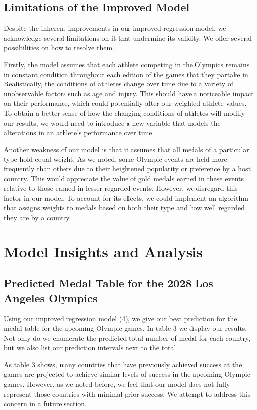 \documentclass{mcmthesis}
\begin{document}
\subsection{Limitations of the Improved Model}
Despite the inherent improvements in our improved regression model, we acknowledge several limitations on it that undermine its validity. We offer several possibilities on how to resolve them. \par 
Firstly, the model assumes that each athlete competing in the Olympics remains in constant condition throughout each edition of the games that they partake in. Realistically, the conditions of athletes change over time due to a variety of unobservable factors such as age and injury. This should have a noticeable impact on their performance, which could potentially alter our weighted athlete values. To obtain a better sense of how the changing conditions of athletes will modify our results, we would need to introduce a new variable that models the alterations in an athlete's performance over time. \par
Another weakness of our model is that it assumes that all medals of a particular type hold equal weight. As we noted, some Olympic events are held more frequently than others due to their heightened popularity or preference by a host country. This would appreciate the value of gold medals earned in these events relative to those earned in lesser-regarded events. However, we disregard this factor in our model. To account for its effects, we could implement an algorithm that assigns weights to medals based on both their type and how well regarded they are by a country. \par

\section{Model Insights and Analysis}
\subsection{Predicted Medal Table for the 2028 Los Angeles Olympics}
Using our improved regression model (4), we give our best prediction for the medal table for the upcoming Olympic games. In table 3 we display our results. Not only do we enumerate the predicted total number of medal for each country, but we also list our prediction intervals next to the total. \par
As table 3 shows, many countries that have previously achieved success at the games are projected to achieve similar levels of success in the upcoming Olympic games. However, as we noted before, we feel that our model does not fully represent those countries with minimal prior success. We attempt to address this concern in a future section. 
\newpage
\end{document}
